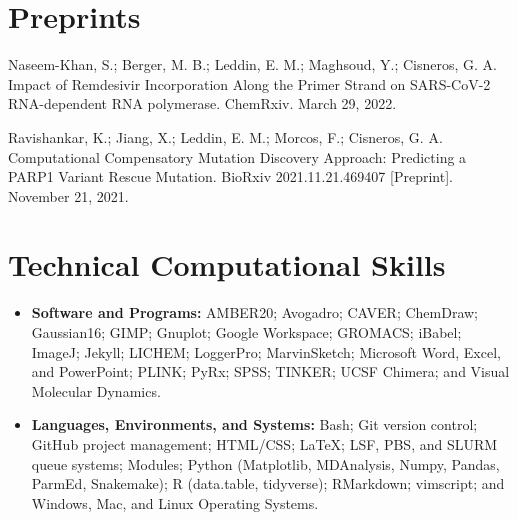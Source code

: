 \documentclass[letterpaper,11pt]{article}
\newcommand{\resumeItem}[2]{
  \item\small{
    \textbf{#1}{ #2 \vspace{-2pt}}
  }
}
\newcommand{\resumeSubItem}[2]{\resumeItem{#1}{#2}\vspace{-4pt}}
\newcommand{\resumeSubHeadingListStart}{\begin{itemize}[leftmargin=*]}
\newcommand{\resumeSubHeadingListEnd}{\end{itemize}}
\begin{document}
\section{Preprints}
\begin{etaremune}
\small{
\item Naseem-Khan, S.; Berger, M. B.; Leddin, E. M.; Maghsoud, Y.; Cisneros, G. A. 
Impact of Remdesivir Incorporation Along the Primer Strand on SARS-CoV-2 RNA-dependent RNA polymerase.
ChemRxiv. March 29, 2022. 
\item Ravishankar, K.; Jiang, X.; Leddin, E. M.; Morcos, F.; Cisneros, G. A.
Computational Compensatory Mutation Discovery Approach: Predicting a PARP1 Variant Rescue Mutation.
BioRxiv 2021.11.21.469407 [Preprint]. November 21, 2021. 
}
\end{etaremune}

\newpage

\section{Technical Computational Skills}
  \resumeSubHeadingListStart
    \resumeSubItem{Software and Programs:}
      {AMBER20; Avogadro; CAVER; ChemDraw; Gaussian16; GIMP; Gnuplot; Google Workspace; GROMACS; iBabel; ImageJ; Jekyll; LICHEM; LoggerPro; MarvinSketch; Microsoft Word, Excel, and PowerPoint; PLINK; PyRx; SPSS; TINKER; UCSF Chimera; and Visual Molecular Dynamics.}
      \resumeSubItem{Languages, Environments, and Systems:}
      {Bash; Git version control; GitHub project management; HTML/CSS; \LaTeX; LSF, PBS, and SLURM queue systems; Modules; Python (Matplotlib, MDAnalysis, Numpy, Pandas, ParmEd, Snakemake); R (data.table, tidyverse); RMarkdown; vimscript; and Windows, Mac, and Linux Operating Systems.}
\resumeSubHeadingListEnd

\end{document}
